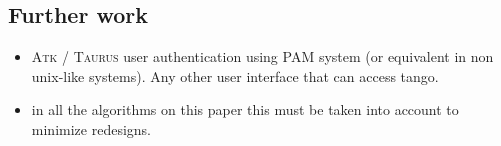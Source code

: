 \documentclass[10pt,a4paper,twoside]{llncs}
\newcommand{\taurus}{\textsc{Taurus} }
\newcommand{\atk}{\textsc{Atk} }
\begin{document}
%
\subsection{Further work \label{sec:further}}

\begin{itemize}
\item \atk/ \taurus user authentication using PAM system (or equivalent in non unix-like systems). Any other user interface that can access tango.
\item in all the algorithms on this paper this must be taken into account to minimize redesigns.
\end{itemize}




\end{document}
